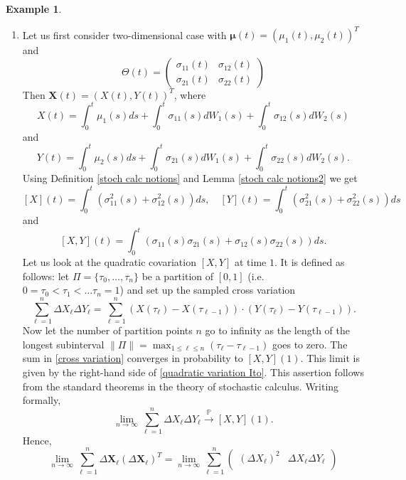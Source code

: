 \documentclass[a4paper,11pt]{book}
\theoremstyle{plain}
\theoremstyle{definition}
\newtheorem{exmp}[thm]{Example}
\begin{document}
	\begin{exmp} \label{quad var} \
		\begin{enumerate}
			\item 
			Let us first consider two-dimensional case with $\boldsymbol{\mu}(t) = (\mu_1(t), \mu_2(t))^T$ and
			\[\Theta(t) = \begin{pmatrix}
			\sigma_{11}(t) & \sigma_{12}(t) \\
			\sigma_{21}(t) & \sigma_{22}(t)
			\end{pmatrix} \]
			Then $\mathbf{X}(t) = (X(t), Y(t))^T$, where 
			\[X(t) = \int_0^t\mu_1(s) ds + \int_0^t\sigma_{11}(s) dW_1(s) + \int_0^t\sigma_{12}(s) dW_2(s)\] 
			and
			\[Y(t) = \int_0^t\mu_2(s) ds + \int_0^t\sigma_{21}(s) dW_1(s) + \int_0^t\sigma_{22}(s) dW_2(s).\]
			Using Definition \ref{stoch calc notions} and Lemma \ref{stoch calc notions2} we get
			\[
			[X](t) = \int_{0}^{t}(\sigma_{11}^2(s) +\sigma_{12}^2(s)) ds, \quad  [Y](t) = \int_{0}^{t}(\sigma_{21}^2(s) +\sigma_{22}^2(s)) ds
			\]
			and
			\begin{equation} \label{quadratic variation Ito}
			[X, Y](t) = \int_{0}^{t}(\sigma_{11}(s)\sigma_{21}(s) + \sigma_{12}(s)\sigma_{22}(s)) ds. 
			\end{equation}
			Let us look at the quadratic covariation $[X, Y]$ at time $1$. It is defined as follows: let $\Pi = \{ \tau_0, \dots, \tau_n \}$ be a partition of $[0, 1]$ (i.e. $0 = \tau_0 < \tau_1 < \dots \tau_n = 1$) and set up the sampled cross variation
			\begin{equation} \label{cross variation}
			\sum_{\ell = 1}^{n} \Delta X_\ell \Delta Y_\ell = \sum_{\ell = 1}^{n} (X(\tau_\ell) - X(\tau_{\ell-1})) \cdot (Y(\tau_\ell) - Y(\tau_{\ell-1})).
			\end{equation}
			Now let the number of partition points $n$ go to infinity as the length of the longest subinterval $\| \Pi \| = \max_{1 \leq \ell \leq n}(\tau_{\ell} - \tau_{\ell-1}) $ goes to zero. The sum in \eqref{cross variation} converges in probability to $[X, Y](1)$. This limit is given by the right-hand side of \eqref{quadratic variation Ito}. This assertion follows from the standard theorems in the theory of stochastic calculus. Writing formally,
			\[  \lim_{n \rightarrow \infty} \sum_{\ell = 1}^{n} \Delta X_\ell \Delta Y_\ell \xrightarrow{\mathbb{P}} [X, Y](1). \]
			Hence,
			\[
			\lim_{n \rightarrow \infty} \sum_{\ell=1}^{n}\Delta \mathbf{X}_\ell(\Delta \mathbf{X}_\ell)^T
			= \lim_{n \rightarrow \infty} \sum_{\ell=1}^{n}\begin{pmatrix}
			(\Delta X_\ell)^2 & \Delta X_\ell \Delta Y_\ell \\

\end{pmatrix}\]
\end{enumerate}
\end{exmp}
\end{document}
